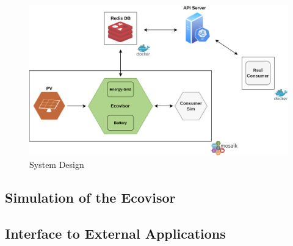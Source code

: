 
\begin{figure}
    \centering
    \includegraphics[width=\linewidth]{figures/system_design}
    \caption{System Design}
    \label{fig:system_design}
\end{figure}

\subsection{Simulation of the Ecovisor}

\subsection{Interface to External Applications}

